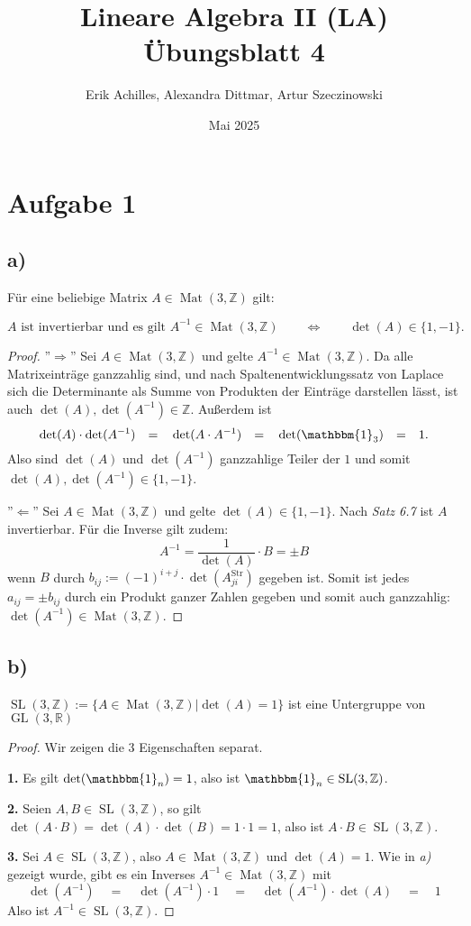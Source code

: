 \documentclass{article}
\title{Lineare Algebra II (LA) Übungsblatt 4}
\author{Erik Achilles, Alexandra Dittmar, Artur Szeczinowski}
\date{Mai 2025}
\newcommand{\ZZ}{\mathbb{Z}}
\newcommand{\RR}{\mathbb{R}}
\newcommand{\equ}{\mathbb{\Leftrightarrow}}
\newcommand{\eq}{\mathbb{\quad = \quad}}
\DeclareMathOperator{\Mat}{Mat}
\DeclareMathOperator{\GL}{GL}
\DeclareMathOperator{\SL}{SL}
\begin{document}
\section*{Aufgabe 1}

\subsection*{a)}
Für eine beliebige Matrix
$A \in \Mat(3,\ZZ)$
gilt:

\[
\text{$A$ ist invertierbar und es gilt $A^{-1} \in \Mat(3,\ZZ)$}
\qquad\equ\qquad
\det(A) \in \{1,-1\}.
\]
\begin{proof}
  ''$\Rightarrow$''  
  Sei $A \in \Mat(3,\ZZ)$
  und gelte
  $A^{-1} \in \Mat(3,\ZZ)$.
  Da alle Matrixeinträge
  ganzzahlig sind, und
  nach Spaltenentwicklungssatz von Laplace
  sich die Determinante als Summe von
  Produkten der Einträge darstellen lässt, ist auch
  $\det(A), \det(A^{-1}) \in \ZZ$.
  Außerdem ist
  \[
  \det(A) \cdot \det(A^{-1})
  \eq
  \det(A \cdot A^{-1})
  \eq
  \det(\mathbbm{1}_3)
  \eq
  1.
  \]
  Also sind
  $\det(A)$ und $\det(A^{-1})$
  ganzzahlige Teiler der $1$ und somit
  $\det(A), \det(A^{-1}) \in \{1,-1\}$.

  \bigbreak

  ''$\Leftarrow$''
  Sei $A \in \Mat(3,\ZZ)$
  und gelte
  $\det(A) \in \{1,-1\}$.
  Nach \textit{Satz 6.7}
  ist $A$ invertierbar.
  Für die Inverse gilt zudem:
  \[
  A^{-1} = \frac{1}{\det(A)} \cdot B = \pm B
  \]
  wenn $B$ durch
  $b_{ij} := (-1)^{i+j} \cdot \det(A_{ji}^{\text{Str}})$
  gegeben ist. Somit ist jedes $a_{ij} = \pm b_{ij}$ durch ein Produkt
  ganzer Zahlen gegeben und somit auch ganzzahlig:
  $\det(A^{-1}) \in \Mat(3,\ZZ)$.
\end{proof}

\subsection*{b)}

$\SL(3,\ZZ) := \{A \in \Mat(3,\ZZ) | \det(A) = 1\}$
ist eine Untergruppe von
$\GL(3,\RR)$

\begin{proof}
  Wir zeigen die 3 Eigenschaften separat.

  \textbf{1.}
  Es gilt
  $\det(\mathbbm{1}_n) = 1$,
  also ist
  $\mathbbm{1}_n \in \SL(3,\ZZ)$.

  \textbf{2.}
  Seien
  $A,B \in \SL(3,\ZZ)$,
  so gilt
  $\det(A \cdot B) = \det(A) \cdot \det(B) = 1 \cdot 1 = 1$,
  also ist
  $A \cdot B \in \SL(3,\ZZ)$.

  \textbf{3.}
  Sei
  $A \in \SL(3,\ZZ)$,
  also
  $A \in \Mat(3,\ZZ)$ und $\det(A) = 1$.
  Wie in \textit{a)} gezeigt wurde, gibt es ein
  Inverses $A^{-1} \in \Mat(3,\ZZ)$ mit
  \[
    \det(A^{-1}) \eq \det(A^{-1}) \cdot 1 \eq
    \det(A^{-1}) \cdot \det(A) \eq 1
  \]
  Also ist $A^{-1} \in \SL(3,\ZZ)$.
\end{proof}
\end{document}
